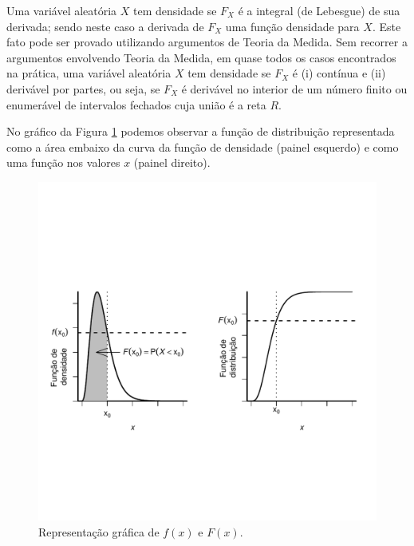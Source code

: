 \begin{frame}
\begin{block}{}
%
%
Uma variável aleatória $X$ tem densidade se $F_X$ é a integral (de
Lebesgue) de sua derivada; sendo neste caso a derivada de $F_X$ uma
função densidade para $X$. Este fato pode ser provado utilizando
argumentos de Teoria da Medida. Sem
recorrer a argumentos envolvendo Teoria da Medida, em quase todos os
casos encontrados na prática, uma variável aleatória $X$ tem
densidade se $F_X$ é (i) contínua e (ii) derivável por partes, ou
seja, se $F_X$ é derivável no interior de um número finito ou
enumerável de intervalos fechados cuja união é a reta $R$.
%
\end{block}

No gráfico da Figura \ref{fig14} podemos observar a função de distribuição representada como a área embaixo da curva da função de densidade (painel esquerdo) e como uma função nos valores $x$ (painel direito).
\begin{figure}[!htbp]
	\vspace{-2.5cm}
	\begin{center}
		\includegraphics[scale=0.5]{fig14.pdf}
		\vspace{-2.7cm}
		\caption{\label{fig14} Representação gráfica de $f(x)$ e $F(x)$.}
		
	\end{center}
\end{figure}

\end{frame}
